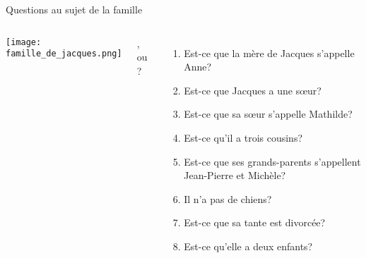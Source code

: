 \documentclass{beamer}
\begin{document}
  \begin{frame}{Questions au sujet de la famille}
    \begin{columns}[T]
        \texttt{[image: famille\_de\_jacques.png]}
        {\small
          ,  ou ?
          \begin{enumerate}
            \item Est-ce que la mère de Jacques s'appelle Anne?
            \item Est-ce que Jacques a une sœur?
            \item Est-ce que sa sœur s'appelle Mathilde?
            \item Est-ce qu'il a trois cousins?
            \item Est-ce que ses grands-parents s'appellent Jean-Pierre et Michèle?
            \item Il n'a pas de chiens?
            \item Est-ce que sa tante est divorcée?
            \item Est-ce qu'elle a deux enfants?
          \end{enumerate}
        }
    \end{columns}
  \end{frame}
\end{document}
